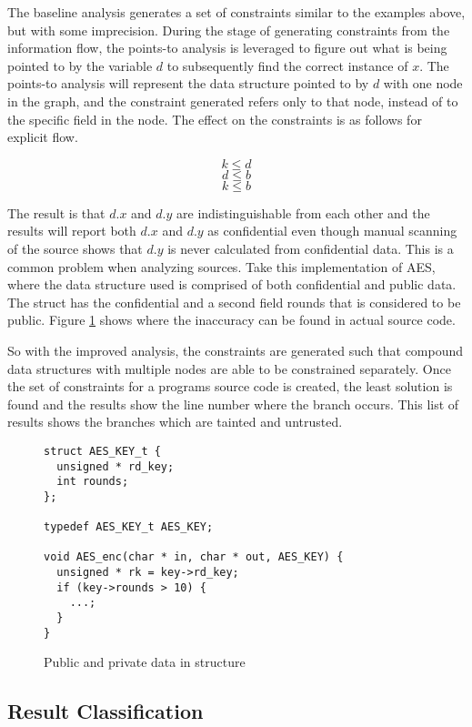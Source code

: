 The baseline analysis generates a set of constraints similar to the examples
above, but with some imprecision. During the stage of generating constraints
from the information flow, the points-to analysis is leveraged to figure out
what is being pointed to by the variable $d$ to subsequently find the correct
instance of $x$. The points-to analysis will represent the data structure
pointed to by $d$ with one node in the graph, and the constraint generated
refers only to that node, instead of to the specific field in the node. The
effect on the constraints is as follows for explicit flow.

\[
  k \leq d
\]
\[
  d \leq b
\]
\[
  k \leq b
\]

The result is that $d.x$ and $d.y$ are indistinguishable from each other and the
results will report both $d.x$ and $d.y$ as confidential even though manual
scanning of the source shows that $d.y$ is never calculated from confidential
data. This is a common problem when analyzing sources. Take this implementation
of AES, where the data structure used is comprised of both confidential and
public data. The  struct has the confidential  and a second field
rounds that is considered to be public. Figure \ref{alg:aesstruct} shows
where the inaccuracy can be found in actual source code.

So with the improved analysis, the constraints are generated such that compound
data structures with multiple nodes are able to be constrained separately. Once
the set of constraints for a programs source code is created, the least solution
is found and the results show the line number where the branch occurs. This list
of results shows the branches which are tainted and untrusted. 

\begin{figure}[h!]
\begin{lstlisting}
struct AES_KEY_t {
  unsigned * rd_key;
  int rounds;
};

typedef AES_KEY_t AES_KEY;

void AES_enc(char * in, char * out, AES_KEY) {
  unsigned * rk = key->rd_key;
  if (key->rounds > 10) {
    ...;
  }
}
\end{lstlisting}
\caption{Public and private data in structure}
\label{alg:aesstruct}
\end{figure}

\subsection{Result Classification}

